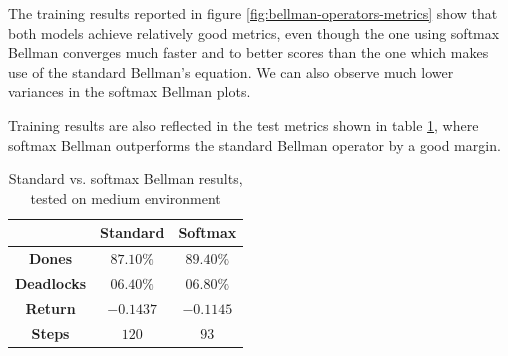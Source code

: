 \documentclass[a4paper,10pt]{report}
\begin{document}
The training results reported in figure \ref{fig:bellman-operators-metrics} show that both models achieve relatively good metrics, even though the one using softmax Bellman converges much faster and to better scores than the one which makes use of the standard Bellman's equation. We can also observe much lower variances in the softmax Bellman plots.

Training results are also reflected in the test metrics shown in table \ref{table:bellman-operators-res}, where softmax Bellman outperforms the standard Bellman operator by a good margin. 

\begin{table}[h]
	\center
	\begin{tabular}{|c|c|c|}
		\hline & \textbf{Standard} & \textbf{Softmax} \\ \hline
		\textbf{Dones}      & $87.10\%$ & $89.40\%$ \\ \hline
		\textbf{Deadlocks}  & $06.40\%$ & $06.80\%$ \\ \hline
		\textbf{Return}     & $-0.1437$ & $-0.1145$ \\ \hline
		\textbf{Steps}      & $120$ & $93$ \\ \hline
	\end{tabular}
	\caption{Standard vs. softmax Bellman results, tested on medium environment}
	\label{table:bellman-operators-res}
\end{table}
\end{document}
